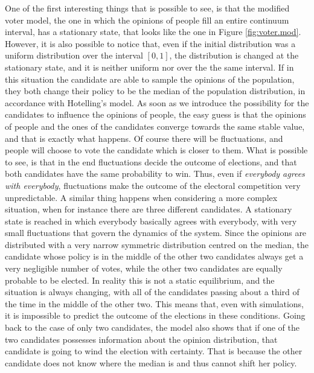\documentclass[11pt,a4paper,twocolumn]{article}
\begin{document}
One of the first interesting things that is possible to see, is that the modified voter model, the one in which the opinions of people fill an entire continuum interval, has a stationary state, that looks like the one in Figure \ref{fig:voter.mod}. However, it is also possible to notice that, even if the initial distribution was a uniform distribution over the interval $[0,1]$, the distribution is changed at the stationary state, and it is neither uniform nor over the the same interval.
If in this situation the candidate are able to sample the opinions of the population, they both change their policy to be the median of the population distribution, in accordance with Hotelling's model.
As soon as we introduce the possibility for the candidates to influence the opinions of people, the easy guess is that the opinions of people and the ones of the candidates converge towards the same stable value, and that is exactly what happens. Of course there will be fluctuations, and people will choose to vote the candidate which is closer to them. What is possible to see, is that in the end fluctuations decide the outcome of elections, and that both candidates have the same probability to win. Thus, even if \emph{everybody agrees with everybody}, fluctuations make the outcome of the electoral competition very unpredictable.
A similar thing happens when considering a more complex situation, when for instance there are three different candidates.
A stationary state is reached in which everybody basically agrees with everybody, with very small fluctuations that govern the dynamics of the system. Since the opinions are distributed with a very narrow symmetric distribution centred on the median, the candidate whose policy is in the middle of the other two candidates always get a very negligible number of votes, while the other two candidates are equally probable to be elected. In reality this is not a static equilibrium, and the situation is always changing, with all of the candidates passing about a third of the time in the middle of the other two. This means that, even with simulations, it is impossible to predict the outcome of the elections in these conditions.
Going back to the case of only two candidates, the model also shows that if one of the two candidates possesses information about the opinion distribution, that candidate is going to wind the election with certainty. That is because the other candidate does not know where the median is and thus cannot shift her policy.
\end{document}
